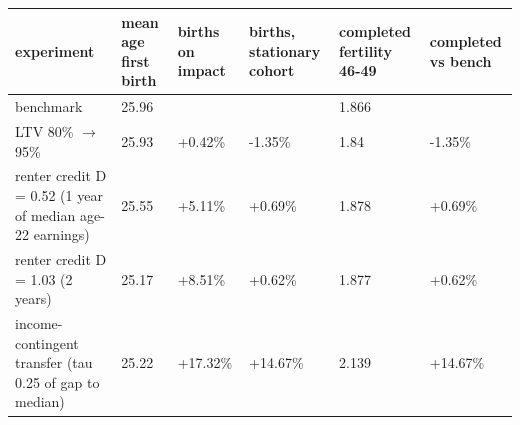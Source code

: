 \begingroup\small
\setlength{\tabcolsep}{3pt}
\renewcommand{\arraystretch}{1.04}
\begin{tabularx}{\linewidth}{XXXXXX}
\toprule
experiment & mean age first birth & births on impact & births, stationary cohort & completed fertility 46-49 & completed vs bench \\
\midrule
benchmark & 25.96 &  &  & 1.866 &  \\
LTV 80\% $\to$ 95\% & 25.93 & +0.42\% & -1.35\% & 1.84 & -1.35\% \\
renter credit D = 0.52 (1 year of median age-22 earnings) & 25.55 & +5.11\% & +0.69\% & 1.878 & +0.69\% \\
renter credit D = 1.03 (2 years) & 25.17 & +8.51\% & +0.62\% & 1.877 & +0.62\% \\
income-contingent transfer (tau 0.25 of gap to median) & 25.22 & +17.32\% & +14.67\% & 2.139 & +14.67\% \\
\bottomrule
\end{tabularx}
\endgroup
